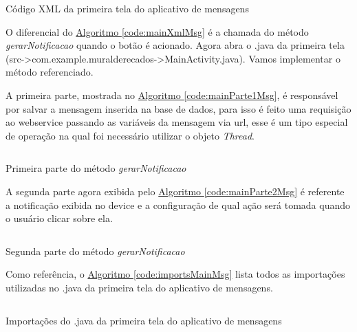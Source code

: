 \documentclass[a4paper,12pt,brazil,oneside]{book}
\begin{document}
\begin{listing}[H]
	\inputminted[linenos=true,fontsize=\small,frame=lines, framesep=2mm, tabsize=2,numbersep=5pt]{xml}{src/devapp/muraldemensagens/main.xml}
	\caption{Código XML da primeira tela do aplicativo de mensagens}
	\label{code:mainXmlMsg}
	\end{listing}
	
O diferencial do \hyperref[code:mainXmlMsg]{Algoritmo \ref*{code:mainXmlMsg}} é a chamada do método \emph{gerarNotificacao} quando o botão é acionado. Agora abra o .java da primeira tela (src->com.example.muralderecados->MainActivity.java). Vamos implementar o método referenciado.

A primeira parte, mostrada no \hyperref[code:mainParte1Msg]{Algoritmo \ref*{code:mainParte1Msg}}, é responsável por salvar a mensagem inserida na base de dados, para isso é feito uma requisição ao webservice passando as variáveis da mensagem via url, esse é um tipo especial de operação na qual foi necessário utilizar o objeto \emph{Thread}.

\begin{listing}[H]
	\inputminted[linenos=true,fontsize=\small,frame=lines, framesep=2mm, tabsize=2,numbersep=5pt]{xml}{src/devapp/muraldemensagens/mainParte1.java}
	\caption{Primeira parte do método \emph{gerarNotificacao}}
	\label{code:mainParte1Msg}
	\end{listing}
	
A segunda parte agora exibida pelo \hyperref[code:mainParte2Msg]{Algoritmo \ref*{code:mainParte2Msg}} é referente a notificação exibida no device e a configuração de qual ação será tomada quando o usuário clicar sobre ela.

\begin{listing}[H]
	\inputminted[linenos=true,fontsize=\small,frame=lines, framesep=2mm, tabsize=2,numbersep=5pt]{xml}{src/devapp/muraldemensagens/mainParte2.java}
	\caption{Segunda parte do método \emph{gerarNotificacao}}
	\label{code:mainParte2Msg}
	\end{listing}
	
Como referência, o \hyperref[code:importsMainMsg]{Algoritmo \ref*{code:importsMainMsg}} lista todos as importações utilizadas no .java da primeira tela do aplicativo de mensagens.

\begin{listing}[H]
	\inputminted[linenos=true,fontsize=\small,frame=lines, framesep=2mm, tabsize=2,numbersep=5pt]{xml}{src/devapp/muraldemensagens/importsMain.java}
	\caption{Importações do .java da primeira tela do aplicativo de mensagens}
	\label{code:importsMainMsg}
	\end{listing}
\end{document}
